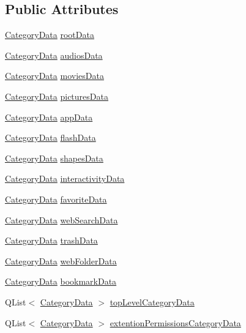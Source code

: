\subsection*{Public Attributes}
\begin{DoxyCompactItemize}
\item 
\hyperlink{struct_category_data}{Category\-Data} \hyperlink{class_u_b_features_controller_a600c5ec46102f01204da3af436b51cc3}{root\-Data}
\item 
\hyperlink{struct_category_data}{Category\-Data} \hyperlink{class_u_b_features_controller_a96885273da6eef4ead9cdd4134581e15}{audios\-Data}
\item 
\hyperlink{struct_category_data}{Category\-Data} \hyperlink{class_u_b_features_controller_adefa77cdfc7ce7724827260d27276a6b}{movies\-Data}
\item 
\hyperlink{struct_category_data}{Category\-Data} \hyperlink{class_u_b_features_controller_a81f11d3b273515a82f278a85818229f3}{pictures\-Data}
\item 
\hyperlink{struct_category_data}{Category\-Data} \hyperlink{class_u_b_features_controller_ad275980ee495eceb548f281113b6eb54}{app\-Data}
\item 
\hyperlink{struct_category_data}{Category\-Data} \hyperlink{class_u_b_features_controller_a93ba08c8e20249435c29fcf20a1e8a6e}{flash\-Data}
\item 
\hyperlink{struct_category_data}{Category\-Data} \hyperlink{class_u_b_features_controller_a9618c1741e96d986554d89c89448f709}{shapes\-Data}
\item 
\hyperlink{struct_category_data}{Category\-Data} \hyperlink{class_u_b_features_controller_a937e5247cebfecd14f7add2f56f35598}{interactivity\-Data}
\item 
\hyperlink{struct_category_data}{Category\-Data} \hyperlink{class_u_b_features_controller_a252e15cb9fd4a8957f690451517f19d8}{favorite\-Data}
\item 
\hyperlink{struct_category_data}{Category\-Data} \hyperlink{class_u_b_features_controller_a9f8defc86c89aed213113200a3dc37a6}{web\-Search\-Data}
\item 
\hyperlink{struct_category_data}{Category\-Data} \hyperlink{class_u_b_features_controller_a2a5e91b0b4a93ba5b1b293c3e7b4f170}{trash\-Data}
\item 
\hyperlink{struct_category_data}{Category\-Data} \hyperlink{class_u_b_features_controller_aa1716f370611e4e5de267ed6d0d6f0fd}{web\-Folder\-Data}
\item 
\hyperlink{struct_category_data}{Category\-Data} \hyperlink{class_u_b_features_controller_aade4e1f1ad502444c2ebb3619bed1d17}{bookmark\-Data}
\item 
Q\-List$<$ \hyperlink{struct_category_data}{Category\-Data} $>$ \hyperlink{class_u_b_features_controller_aa371ff5d43f0238241efb764da577a66}{top\-Level\-Category\-Data}
\item 
Q\-List$<$ \hyperlink{struct_category_data}{Category\-Data} $>$ \hyperlink{class_u_b_features_controller_a71500c59720c4ce5778bc8cf3bf04510}{extention\-Permissions\-Category\-Data}
\end{DoxyCompactItemize}
